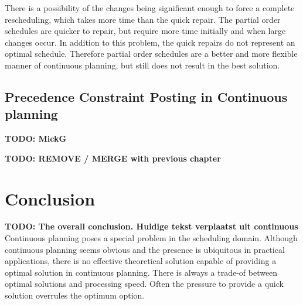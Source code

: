 \documentclass{article}
\newcommand{\TODO}[1]{{\color{red}\textbf{TODO: #1}}}
\begin{document}
There is a possibility of the changes being significant enough to force a complete rescheduling, which takes more time than the quick repair.
The partial order schedules are quicker to repair, but require more time initially and when large changes occur.
In addition to this problem, the quick repairs do not represent an optimal schedule.
Therefore partial order schedules are a better and more flexible manner of continuous planning, but still does not result in the best solution.

\subsection{Precedence Constraint Posting in Continuous planning}
\TODO{MickG}

\TODO{REMOVE / MERGE with previous chapter}
%
%
%
%
%


\newpage

\section{Conclusion}
\TODO{The overall conclusion.
Huidige tekst verplaatst uit continuous}
Continuous planning poses a special problem in the scheduling domain.
Although continuous planning seems obvious and the presence is ubiquitous in practical applications, there is no effective theoretical solution capable of providing a optimal solution in continuous planning.
There is always a trade-of between optimal solutions and processing speed.
Often the pressure to provide a quick solution overrules the optimum option.

\newpage


\end{document}
